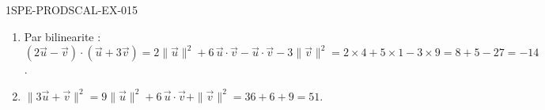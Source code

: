 \begin{corrige}{1SPE-PRODSCAL-EX-015}
\begin{enumerate}
\item Par bilinearite : $(2\vec{u} - \vec{v}) \cdot (\vec{u} + 3\vec{v}) = 2\|\vec{u}\|^2 + 6\,\vec{u} \cdot \vec{v} - \vec{u} \cdot \vec{v} - 3\|\vec{v}\|^2 = 2 \times 4 + 5 \times 1 - 3 \times 9 = 8 + 5 - 27 = -14$.
\item $\|3\vec{u} + \vec{v}\|^2 = 9\|\vec{u}\|^2 + 6\,\vec{u} \cdot \vec{v} + \|\vec{v}\|^2 = 36 + 6 + 9 = 51$.
\end{enumerate}
\end{corrige}
